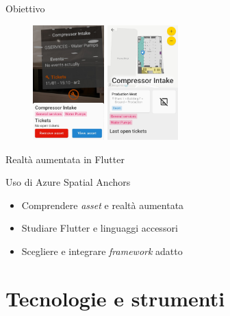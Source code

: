 \documentclass{beamer}
\begin{document}
	\begin{frame}{Obiettivo}

 \begin{figure}
    \centering
    \includegraphics[width=0.245\textwidth]{immagini/asset_card.jpg}\hfill
    \includegraphics[width=0.245\textwidth]{immagini/plant_asset_screenshot.jpg}
\end{figure}
    

		Realtà aumentata in Flutter\\ \vspace{.5em}
  
Uso di Azure Spatial Anchors \vspace{.5em}

		\begin{itemize}
			\item Comprendere \textit{asset} e realtà aumentata   \vspace{.5em}
			\item Studiare Flutter e linguaggi accessori \vspace{.5em}
			\item Scegliere e integrare \textit{framework} adatto \vspace{.5em}
		\end{itemize}
	\end{frame}
 

	\section{Tecnologie e strumenti}
\end{document}
